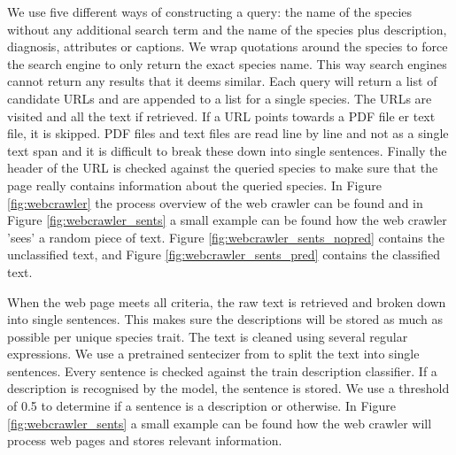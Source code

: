 \documentclass[a4paper, 12pt, oneside]{book} %
\begin{document}
We use five different ways of constructing a query: the name of the species without any additional search term and the name of the species plus description, diagnosis, attributes or captions.
We wrap quotations around the species to force the search engine to only return the exact species name.
This way search engines cannot return any results that it deems similar.
Each query will return a list of candidate URLs and are appended to a list for a single species.
The URLs are visited and all the text if retrieved.
If a URL points towards a PDF file er text file, it is skipped.
PDF files and text files are read line by line and not as a single text span and it is difficult to break these down into single sentences. 
Finally the header of the URL is checked against the queried species to make sure that the page really contains information about the queried species.
In Figure \ref{fig:webcrawler} the process overview of the web crawler can be found and in Figure \ref{fig:webcrawler_sents} a small example can be found how the web crawler 'sees' a random piece of text.
Figure \ref{fig:webcrawler_sents_nopred} contains the unclassified text, and Figure \ref{fig:webcrawler_sents_pred} contains the classified text.

When the web page meets all criteria, the raw text is retrieved and broken down into single sentences. 
This makes sure the descriptions will be stored as much as possible per unique species trait.
The text is cleaned using several regular expressions. %
We use a pretrained sentecizer from \textcite{wolf_huggingfaces_2020} to split the text into single sentences.
Every sentence is checked against the train description classifier.
If a description is recognised by the model, the sentence is stored.
We use a threshold of 0.5 to determine if a sentence is a description or otherwise.
In Figure \ref{fig:webcrawler_sents} a small example can be found how the web crawler will process web pages and stores relevant information. 
\end{document}
